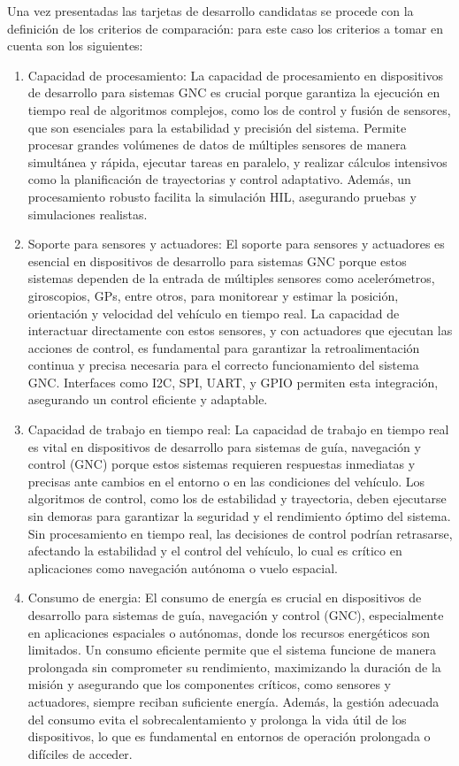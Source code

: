 Una vez presentadas las tarjetas de desarrollo candidatas se procede con la definición de los criterios de comparación: para este caso los criterios a tomar en cuenta son los siguientes:

\begin{enumerate}
    \item Capacidad de procesamiento: La capacidad de procesamiento en dispositivos de desarrollo para sistemas GNC es crucial porque garantiza la ejecución en tiempo real de algoritmos complejos, como los de control y fusión de sensores, que son esenciales para la estabilidad y precisión del sistema. Permite procesar grandes volúmenes de datos de múltiples sensores de manera simultánea y rápida, ejecutar tareas en paralelo, y realizar cálculos intensivos como la planificación de trayectorias y control adaptativo. Además, un procesamiento robusto facilita la simulación HIL, asegurando pruebas y simulaciones realistas.

    \item Soporte para sensores y actuadores: El soporte para sensores y actuadores es esencial en dispositivos de desarrollo para sistemas GNC porque estos sistemas dependen de la entrada de múltiples sensores como acelerómetros, giroscopios, GPs, entre otros, para monitorear y estimar la posición, orientación y velocidad del vehículo en tiempo real. La capacidad de interactuar directamente con estos sensores, y con actuadores que ejecutan las acciones de control, es fundamental para garantizar la retroalimentación continua y precisa necesaria para el correcto funcionamiento del sistema GNC. Interfaces como I2C, SPI, UART, y GPIO permiten esta integración, asegurando un control eficiente y adaptable.

    \item Capacidad de trabajo en tiempo real: La capacidad de trabajo en tiempo real es vital en dispositivos de desarrollo para sistemas de guía, navegación y control (GNC) porque estos sistemas requieren respuestas inmediatas y precisas ante cambios en el entorno o en las condiciones del vehículo. Los algoritmos de control, como los de estabilidad y trayectoria, deben ejecutarse sin demoras para garantizar la seguridad y el rendimiento óptimo del sistema. Sin procesamiento en tiempo real, las decisiones de control podrían retrasarse, afectando la estabilidad y el control del vehículo, lo cual es crítico en aplicaciones como navegación autónoma o vuelo espacial.

    \item Consumo de energia: El consumo de energía es crucial en dispositivos de desarrollo para sistemas de guía, navegación y control (GNC), especialmente en aplicaciones espaciales o autónomas, donde los recursos energéticos son limitados. Un consumo eficiente permite que el sistema funcione de manera prolongada sin comprometer su rendimiento, maximizando la duración de la misión y asegurando que los componentes críticos, como sensores y actuadores, siempre reciban suficiente energía. Además, la gestión adecuada del consumo evita el sobrecalentamiento y prolonga la vida útil de los dispositivos, lo que es fundamental en entornos de operación prolongada o difíciles de acceder.


\end{enumerate}
